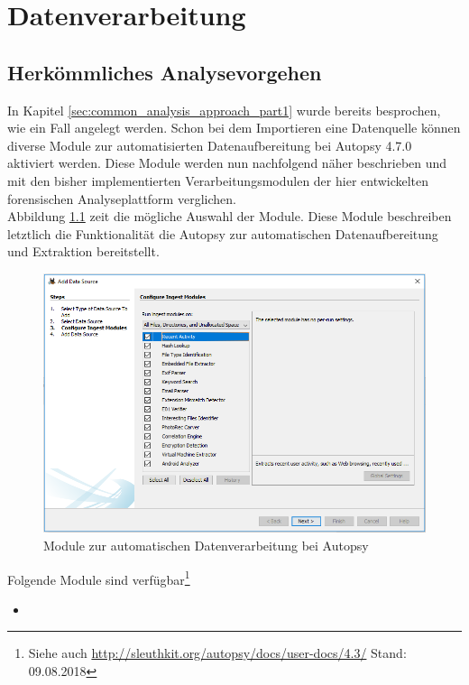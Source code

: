 \chapter{Datenverarbeitung}
\label{ch:data_processing}

\section{Herkömmliches Analysevorgehen}
\label{sec:common_analysis_approach_part2}

In Kapitel \ref{sec:common_analysis_approach_part1} wurde bereits besprochen, wie ein Fall angelegt werden. Schon bei dem Importieren eine Datenquelle können diverse Module zur automatisierten Datenaufbereitung bei Autopsy 4.7.0 aktiviert werden. Diese Module werden nun nachfolgend näher beschrieben und mit den bisher implementierten Verarbeitungsmodulen der hier entwickelten forensischen Analyseplattform verglichen.\\

Abbildung \ref{fig:autopsy_2_ingest_modules} zeit die mögliche Auswahl der Module.
Diese Module beschreiben letztlich die Funktionalität die Autopsy zur automatischen Datenaufbereitung und Extraktion bereitstellt. 

\begin{figure}[ht]
  \centering
  \includegraphics[width=\textwidth]{./resource/autopsy_2_ingest_modules.png}
  \caption{Module zur automatischen Datenverarbeitung bei Autopsy}
  \label{fig:autopsy_2_ingest_modules}
\end{figure}

Folgende Module sind verfügbar\footnote{Siehe auch \url{http://sleuthkit.org/autopsy/docs/user-docs/4.3/} Stand: 09.08.2018}
\begin{itemize}
\item
\end{itemize}

